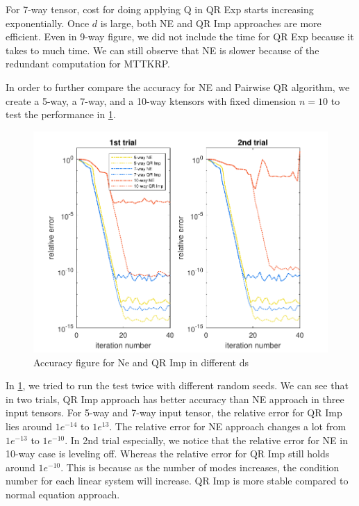\documentclass{article}
\begin{document}
For 7-way tensor, cost for doing applying Q in QR Exp starts increasing exponentially.
Once $d$ is large, both NE and QR Imp approaches are more efficient.
Even in 9-way figure, we did not include the time for QR Exp because it takes to much time.
We can still observe that NE is slower because of the redundant computation for MTTKRP.



In order to further compare the accuracy for NE and Pairwise QR algorithm, we create a 5-way, a 7-way, and a 10-way ktensors with fixed dimension $n = 10$ to test the performance in \cref{fig:error}.

\begin{figure}[ht!]
  \begin{center}
    
    \includegraphics*[scale = 1.1]{sinsums_acc2.pdf}
    \caption[Figure]{Accuracy figure for Ne and QR Imp in different ds \label{fig:error}}
  \end{center}
  
\end{figure}

In \cref{fig:error}, we tried to run the test twice with different random seeds. 
We can see that in two trials, QR Imp approach has better accuracy than NE approach in three input tensors.
For 5-way and 7-way input tensor, the relative error for QR Imp lies around $1e^{-14}$ to $1e^{13}$.
The relative error for NE approach changes a lot from $1e^{-13}$ to $1e^{-10}$.
In 2nd trial especially, we notice that the relative error for NE in 10-way case is leveling off.
Whereas the relative error for QR Imp still holds around $1e^{-10}$.
This is because as the number of modes increases, the condition number for each linear system will increase.
QR Imp is more stable compared to normal equation approach.
\end{document}
